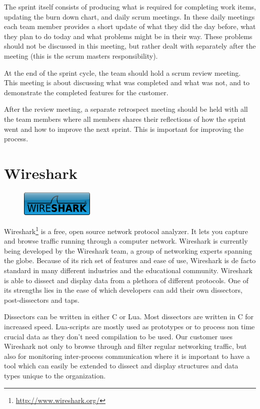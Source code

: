The sprint itself consists of producing what is required for completing work
items, updating the burn down chart, and daily scrum meetings. In these daily
meetings each team member provides a short update of what they did the day
before, what they plan to do today and what problems might be in their way.
These problems should not be discussed in this meeting, but rather dealt with
separately after the meeting (this is the scrum masters responsibility).

At the end of the sprint cycle, the team should hold a scrum review meeting.
This meeting is about discussing what was completed and what was not, and to
demonstrate the completed features for the customer.

After the review meeting, a separate retrospect meeting should be held with all
the team members where all members shares their reflections of how the sprint
went and how to improve the next sprint. This is important for improving the
process.


\section{Wireshark}
\label{sec:pre:wireshark}
\begin{figure}
	\vspace{-10pt}
	\includegraphics[width=3.5cm]{./planning/img/wireshark_logo}
	\vspace{-20pt}
\end{figure}
Wireshark\footnote{\url{http://www.wireshark.org/}} is a free, open source
network protocol analyzer. It lets you capture and browse traffic running
through a computer network. Wireshark is currently being developed by the
Wireshark team, a group of networking experts spanning the globe. Because of
its rich set of features and ease of use, Wireshark is de facto standard in
many different industries and the educational community. Wireshark is able to
dissect and display data from a plethora of different protocols. One of its
strengths lies in the ease of which developers can add their own dissectors,
post-dissectors and taps.

Dissectors can be written in either C or Lua. Most dissectors are written in C
for increased speed. Lua-scripts are mostly used as prototypes or to process
non time crucial data as they don't need compilation to be used. Our customer
uses Wireshark not only to browse through and filter regular networking
traffic, but also for monitoring inter-process communication where it is
important to have a tool which can easily be extended to dissect and display
structures and data types unique to the organization.


